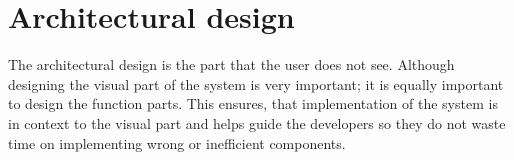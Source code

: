 \chapter{Architectural design}

The architectural design is the part that the user does not see.
Although designing the visual part of the system is very important; it is equally important to design the function parts.
This ensures, that implementation of the system is in context to the visual part and helps guide the developers so they do not waste time on implementing wrong or inefficient components.